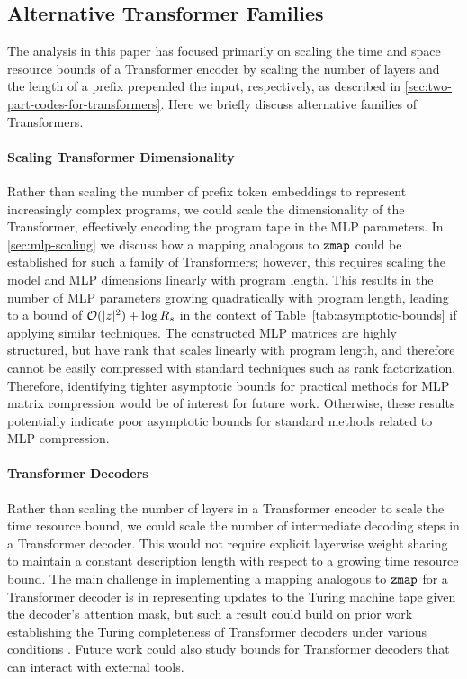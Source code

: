  
 
\subsection{Alternative Transformer Families}
\label{sec:alternative-families}

The analysis in this paper has focused primarily on scaling the time and space resource bounds of a Transformer encoder by scaling the number of layers and the length of a prefix prepended the input, respectively, as described in \ref{sec:two-part-codes-for-transformers}. Here we briefly discuss alternative families of Transformers.

\paragraph{Scaling Transformer Dimensionality} Rather than scaling the number of prefix token embeddings to represent increasingly complex programs, we could scale the dimensionality of the Transformer, effectively encoding the program tape in the MLP parameters. In \ref{sec:mlp-scaling} we discuss how a mapping analogous to $\texttt{zmap}$ could be established for such a family of Transformers; however, this requires scaling the model and MLP dimensions linearly with program length. This results in the number of MLP parameters growing quadratically with program length, leading to a bound of ${\mathcal{O}}(|z|^2) + \log R_s$ in the context of Table~\ref{tab:asymptotic-bounds} if applying similar techniques. The constructed MLP matrices are highly structured, but have rank that scales linearly with program length, and therefore cannot be easily compressed with standard techniques such as rank factorization. Therefore, identifying tighter asymptotic bounds for practical methods for MLP matrix compression would be of interest for future work. Otherwise, these results potentially indicate poor asymptotic bounds for standard methods related to MLP compression.

\paragraph{Transformer Decoders} Rather than scaling the number of layers in a Transformer encoder to scale the time resource bound, we could scale the number of intermediate decoding steps in a Transformer decoder. This would not require explicit layerwise weight sharing to maintain a constant description length with respect to a growing time resource bound. The main challenge in implementing a mapping analogous to $\texttt{zmap}$ for a Transformer decoder is in representing updates to the Turing machine tape given the decoder's attention mask, but such a result could build on prior work establishing the Turing completeness of Transformer decoders under various conditions \citep{perez2021attention,merrill2024expressive,li2025constant}. Future work could also study bounds for Transformer decoders that can interact with external tools.